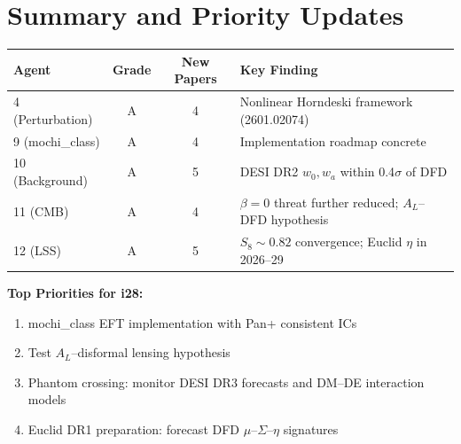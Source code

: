 \documentclass[11pt,a4paper]{article}
\begin{document}
\section{Summary and Priority Updates}

\begin{center}
\begin{tabular}{lccl}
\toprule
\textbf{Agent} & \textbf{Grade} & \textbf{New Papers} & \textbf{Key Finding} \\
\midrule
4 (Perturbation) & A & 4 & Nonlinear Horndeski framework (2601.02074) \\
9 (mochi\_class) & A & 4 & Implementation roadmap concrete \\
10 (Background) & A & 5 & DESI DR2 $w_0, w_a$ within 0.4$\sigma$ of DFD \\
11 (CMB) & A & 4 & $\beta=0$ threat further reduced; $A_L$--DFD hypothesis \\
12 (LSS) & A & 5 & $S_8 \sim 0.82$ convergence; Euclid $\eta$ in 2026--29 \\
\bottomrule
\end{tabular}
\end{center}

\textbf{Top Priorities for i28:}
\begin{enumerate}
\item mochi\_class EFT implementation with Pan+ consistent ICs
\item Test $A_L$--disformal lensing hypothesis
\item Phantom crossing: monitor DESI DR3 forecasts and DM--DE interaction models
\item Euclid DR1 preparation: forecast DFD $\mu$--$\Sigma$--$\eta$ signatures
\end{enumerate}
\end{document}
